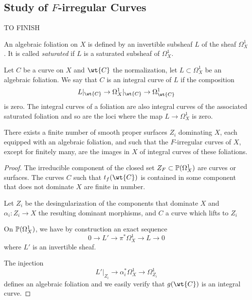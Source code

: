 \documentclass[main.tex]{subfiles}
\begin{document}
\subsection{Study of $F$-irregular Curves}

{\color{red} TO FINISH}

\begin{defn}
An algebraic foliation on $X$ is defined by an invertible subsheaf $L$ of the sheaf $\Omega_X^1$. It is called \textit{saturated} if $L$ is a saturated subsheaf of $\Omega_X^1$.
\end{defn}

\begin{defn}
Let $C$ be a curve on $X$ and $\wt{C}$ the normalization, let $L \subset \Omega_X^1$ be an algebraic foliation. We say that $C$ is an integral curve of $L$ if the composition
\[ L|_{\wt{C}} \to \Omega^1_X |_{\wt{C}} \to \Omega^1_{\wt{C}} \]
is zero. The integral curves of a foliation are also integral curves of the associated saturated foliation and so are the loci where the map $L \to \Omega_X^1$ is zero.
\end{defn}

\begin{prop}
There exists a finite number of smooth proper surfaces $Z_i$ dominating $X$, each equipped with an algebraic foliation, and such that the $F$-irregular curves of $X$, except for finitely many, are the images in $X$ of integral curves of these foliations.
\end{prop}

\begin{proof}
The irreducible component of the closed set $Z_F \subset \P(\Omega_X^1)$ are curves or surfaces. The curves $C$ such that $t_f(\wt{C})$ is contained in some component that does not dominate $X$ are finite in number.
\par
Let $Z_i$ be the desingularization of the components that dominate $X$ and $\alpha_i : Z_i \to X$ the resulting dominant morphisms, and $C$ a curve which lifts to $Z_i$
\begin{center}
\end{center}
On $\P(\Omega_X^1)$, we have by construction an exact sequence
\[ 0 \to L' \to \pi^* \Omega_X^1 \to L \to 0 \]
where $L'$ is an invertible sheaf.
\par
The injection
\[ L'|_{Z_i} \to \alpha_i^* \Omega_X^1 \to \Omega^1_{Z_i} \]
defines an algebraic foliation and we easily verify that $g(\wt{C})$ is an integral curve.
\end{proof}
\end{document}
